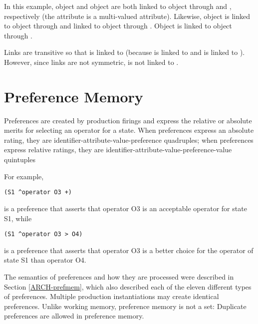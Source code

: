 In this example, object  and object  are both linked to
object  through  and , respectively (the  attribute
is a multi-valued attribute). Likewise, object  is linked to object
 through  and linked to object
 through . Object  is linked
to object  through .

Links are transitive so that  is linked to  (because
 is linked to  and  is linked to
). However, since links are not symmetric,  is not
linked to .


\section{Preference Memory}
\label{SYNTAX-prefmem}

Preferences are created by production firings and express the
relative or absolute merits for selecting an operator for a state.  When
preferences express an absolute rating, they are
identifier-attribute-value-preference quadruples; when preferences
express relative ratings, they are
identifier-attribute-value-preference-value quintuples

For example, 
\begin{verbatim}
(S1 ^operator O3 +)
\end{verbatim}
is a preference that asserts that operator O3 is an acceptable operator for
state S1, while
\begin{verbatim}
(S1 ^operator O3 > O4)
\end{verbatim}
is a preference that asserts that operator O3 is a better choice for the
operator of state S1 than operator O4.

The semantics of preferences and how they are processed were described in
Section \ref{ARCH-prefmem}, which also described each of the eleven different
types of preferences.  Multiple production instantiations may create identical 
preferences. Unlike working memory, preference memory is not a set: Duplicate 
preferences are allowed in preference memory.
